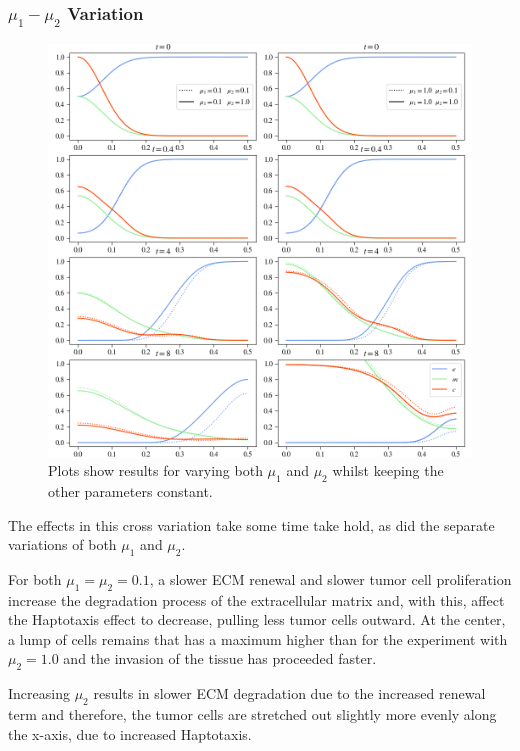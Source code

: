 \subsubsection*{$\mu_1 - \mu_2$ Variation}
\begin{figure}[ht!]
    \centering
    \includegraphics[width=\textwidth]{resources/images/prolif_mu_1_mu_2_variation.png}
    \caption{Plots show results for varying both $\mu_1$ and $\mu_2$ whilst keeping the other parameters constant.}
    \label{fig:prolif_mu_1_mu_2_variation}
\end{figure}
The effects in this cross variation take some time take hold, as did the separate variations of both $\mu_1$ and $\mu_2$. 

For both $\mu_1=\mu_2=0.1$, a slower ECM renewal and slower tumor cell proliferation increase the degradation process of the extracellular matrix and, with this, affect the Haptotaxis effect to decrease, pulling less tumor cells outward. At the center, a lump of cells remains that has a maximum higher than for the experiment with $\mu_2=1.0$ and the invasion of the tissue has proceeded faster.

Increasing $\mu_2$ results in slower ECM degradation due to the increased renewal term and therefore, the tumor cells are stretched out slightly more evenly along the x-axis, due to increased Haptotaxis. 

